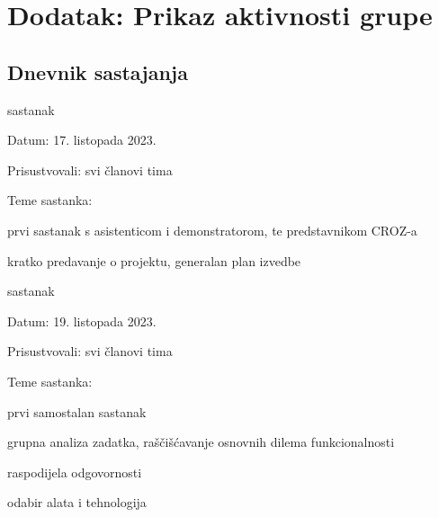 \chapter*{Dodatak: Prikaz aktivnosti grupe}
		
		\section*{Dnevnik sastajanja}
		
		\begin{packed_enum}
			\item  sastanak
			
			\item[] \begin{packed_item}
				\item Datum: 17. listopada 2023.
				\item Prisustvovali: svi članovi tima
				\item Teme sastanka:
				\begin{packed_item}
					\item  prvi sastanak s asistenticom i demonstratorom, te predstavnikom CROZ-a
					\item  kratko predavanje o projektu, generalan plan izvedbe
				\end{packed_item}
			\end{packed_item}
			
			\item  sastanak
			\item[] \begin{packed_item}
				\item Datum: 19. listopada 2023.
				\item Prisustvovali: svi članovi tima
				\item Teme sastanka:
				\begin{packed_item}
					\item  prvi samostalan sastanak
					\item  grupna analiza zadatka, raščišćavanje osnovnih dilema funkcionalnosti
					\item  raspodijela odgovornosti
					\item  odabir alata i tehnologija
				\end{packed_item}
			\end{packed_item}
			

\end{packed_enum}
